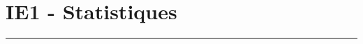 \documentclass[12pt]{article}
\newcommand{\horrule}[1]{\rule{\linewidth}{#1}} %
\begin{document}

\newtheorem{Definition}{Définition}
\newtheorem{Theorem}{Théorème}
\newtheorem{Proposition}{Propriété}

\renewcommand{\labelitemi}{$\bullet$}
\renewcommand{\labelitemii}{$\circ$}

\setlength{\columnseprule}{1pt}

\section*{IE1 - Statistiques}
\horrule{2px}
\end{document}
